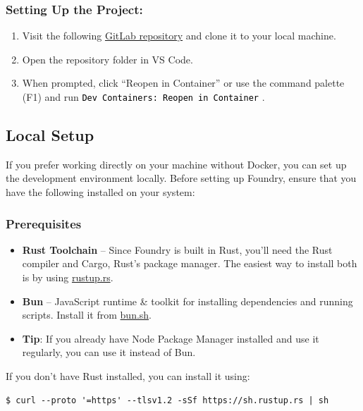 \documentclass[12pt]{article}
\newcommand{\codegrey}[1]{%
  \texttt{\colorbox{black!4}{\textcolor{black}{#1}}}%
}
\begin{document}
\subsubsection*{Setting Up the Project:}

\begin{enumerate}
    \item Visit the following
          \href{https://gitlab.fel.cvut.cz/radovluk/smart-contracts-exercises/-/tree/main/09-Vulnerabilities-Detection/task/task-code}{GitLab
              repository} and clone it to your local machine.
    \item Open the repository folder in VS Code.
    \item When prompted, click ``Reopen in Container'' or use the command palette (F1)
          and run \codegrey{Dev Containers: Reopen in Container}.
\end{enumerate}

\subsection{Local Setup}

If you prefer working directly on your machine without Docker, you can set up
the development environment locally. Before setting up Foundry, ensure that you
have the following installed on your system:

\subsubsection*{Prerequisites}
\begin{itemize}
     \item \textbf{Rust Toolchain} -- Since Foundry is built in Rust, you'll need the Rust compiler and Cargo, Rust's package manager. The easiest way to install both is by using \href{https://rustup.rs/}{rustup.rs}.
        \item \textbf{Bun} -- JavaScript runtime \& toolkit for installing dependencies and running scripts. Install it from \href{https://bun.sh/}{bun.sh}.
        \item \textbf{Tip}: If you already have Node Package Manager installed and use it regularly, you can use it instead of Bun.
\end{itemize}

\noindent
If you don't have Rust installed, you can install it using:

\begin{verbatim}
$ curl --proto '=https' --tlsv1.2 -sSf https://sh.rustup.rs | sh
\end{verbatim}
\end{document}
